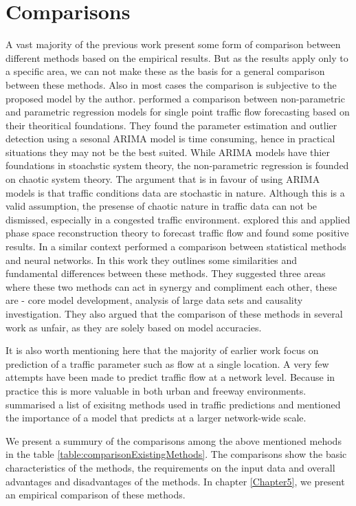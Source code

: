 \section{Comparisons}
A vast majority of the previous work present some form of comparison between different methods based
on the empirical results. But as the results apply only to a specific area, we can not make these
as the basis for a general comparison between these methods. Also in most cases the comparison is
subjective to the proposed model by the author. \citet{smith2002comparison} performed
a comparison between non-parametric and parametric regression models for single point traffic flow
forecasting based on their theoritical foundations. They found the parameter estimation and outlier
detection using a sesonal ARIMA model is time consuming, hence in practical situations they may not be the
best suited. While ARIMA models have thier foundations in stoachstic system theory, the non-parametric
regression is founded on chaotic system theory. The argument that is in favour of using ARIMA models
is that traffic conditions data are stochastic in nature. Although this is a valid assumption, the
presense of chaotic nature in traffic data can not be dismissed, especially in a congested traffic
environment. \citet{hu2003applicable} explored this and applied phase space reconstruction theory to
forecast traffic flow and found some positive results. In a similar context \citet{karlaftis2011statistical}
performed a comparison between statistical methods and neural networks. In this work they outlines some
similarities and fundamental differences between these methods. They suggested three areas where these
two methods can act in synergy and compliment each other, these are - core model development, analysis
of large data sets and causality investigation. They also argued that the comparison of these methods in
several work as unfair, as they are solely based on model accuracies.

It is also worth mentioning here that the majority of earlier work focus on prediction of a traffic
parameter such as flow at a single location. A very few attempts have been made to predict traffic flow
at a network level. Because in practice this is more valuable in both urban and freeway environments.
\citet{van2007short} summarised a list of exisitng methods used in traffic predictions and mentioned
the importance of a model that predicts at a larger network-wide scale.

We present a summury of the comparisons among the above mentioned mehods in the table
\ref{table:comparisonExistingMethods}. The comparisons show the basic characteristics of the methods,
the requirements on the input data and overall advantages and disadvantages of the methods. In
chapter \ref{Chapter5}, we present an empirical comparison of these methods.

